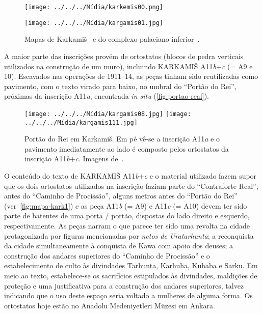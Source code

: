 \begin{figure}[h!]
	\begin{center}
		\texttt{[image: ../../../Mídia/karkemis00.png]}
	\end{center}
	\begin{center}
		\texttt{[image: ../../../Mídia/kargamis01.jpg]}
	\end{center}
	\caption[Mapas de Karkamiš]{Mapas de Karkamiš~\cite[22]{Marchetti2014} e do
		complexo palaciano inferior~\cite[\emph{plate} 41]{CarchemishIII}.}\label{fig:mapa-kark1}
\end{figure}

A maior parte das inscrições provém de ortostatos (blocos de pedra verticais
utilizados na construção de um muro), incluindo KARKAMIŠ A11\emph{b}+\emph{c} (=
A9 e 10).
Escavados nas operações de 1911--14, as peças tinham sido reutilizadas como
pavimento, com o texto virado para baixo,
no umbral do ``Portão do Rei'', próximas da inscrição A11\emph{a},
encontrada \emph{in situ} (\autoref{fig:portao-real}).

\begin{figure}[h!]
	\begin{center}
		\texttt{[image: ../../../Mídia/kargamis08.jpg]}
		\texttt{[image: ../../../Mídia/kargamis111.jpg]}
	\end{center}
	\caption[``Portão do Rei'' em Karkamiš]{Portão do Rei em Karkamiš. Em pé
		vê-se a inscrição A11\emph{a} e o pavimento imediatamente ao lado é
		composto pelos ortostatos da inscrição A11\emph{b}+\emph{c}. Imagens
		de~\cite[\emph{plates} 46--7]{CarchemishIII}.}\label{fig:portao-real}
\end{figure}



O conteúdo do texto de KARKAMIŠ A11\emph{b}+\emph{c} e o material utilizado
fazem supor que os dois ortostatos utilizados na inscrição faziam parte do
``Contraforte Real'', antes do ``Caminho de Procissão'', alguns metros antes do
``Portão do Rei'' (ver~\autoref{fig:mapa-kark1}) e
as peça A11\emph{b} (= A9) e A11\emph{c} (= A10) devem ter sido parte de batentes
de uma porta \slash{} portão, dispostas do lado direito e esquerdo,
respectivamente.
As peças narram o que parece ter sido uma revolta na cidade protagonizada por
figuras mencionadas por \emph{netos de Uratarhunta}; a reconquista da cidade
simultaneamente à conquista de Kawa com apoio dos deuses; a construção dos
andares superiores do ``Caminho de Procissão'' e o estabelecimento de culto às
divindades Tarhunta, Karhuha, Kubaba e Sarku.
Em meio ao texto, estabelece-se os sacrifícios estipulados às divindades,
maldições de proteção e uma justificativa para a construção dos andares
superiores, talvez indicando que o uso deste espaço seria voltado a mulheres de
alguma forma.
Os ortostatos hoje estão no Anadolu Medeniyetleri Müzesi em Ankara.

